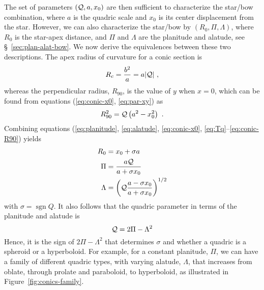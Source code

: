 \documentclass[useAMS, usenatbib, a4paper]{mnras}
\DeclareMathOperator{\sgn}{sgn}
\providecommand{\abs}[1]{\lvert#1\rvert}
\providecommand{\DIFaddbegin}{} %
\providecommand{\DIFaddend}{} %
\providecommand{\DIFdelbegin}{} %
\providecommand{\DIFdelend}{} %
\begin{document}
The set of parameters \((\mathcal{Q}, a, x_0)\) are then sufficient to
characterize the star/bow combination, where \(a\) is the quadric
scale and \(x_0\) is its center displacement from the star.  However,
we can also characterize the star/bow by \((R_0, \Pi, \Lambda)\), where
\(R_0\) is the star-apex distance, and \(\Pi\) and \(\Lambda\) are the
planitude and alatude, see \S~\ref{sec:plan-alat-bow}.  We now derive
the equivalences between these two descriptions.  The apex radius of
curvature for a conic section is
\begin{equation}
  \label{eq:Rc-conic}
  R_c = \frac{b^2}{a} = a \abs{\Q}\ ,
\end{equation}
whereas the perpendicular radius, \(R_{90}\), is the value of \(y\)
when \(x = 0\), which can be found from equations (\ref{eq:conic-x0},
\ref{eq:par-xy}) as
\DIFdelbegin %
\DIFdelend \DIFaddbegin \begin{equation}
  \label{eq:conic-R90}
  R_{90}^2 = \mathcal{Q} \left(a^2 - x_0^2\right) \ .
\end{equation}
\DIFaddend Combining equations (\ref{eq:planitude}, \ref{eq:alatude},
\ref{eq:conic-x0}, \ref{eq:Tq}--\ref{eq:conic-R90}) yields
\begin{align}
  \label{eq:R0-from-Q-a-x0}
  R_0 &= x_0 + \sigma a  \\
  \label{eq:Pi-from-Q-a-x0}
  \Pi &= \frac{a \mathcal{Q}}{a + \sigma x_0} \\
  \label{eq:Lambda-from-Q-a-x0}
  \Lambda &= \left( \mathcal{Q} \frac{a - \sigma x_0} {a + \sigma x_0}  \right)^{1/2}
\end{align}
with \(\sigma = \sgn Q\).  It also follows that the quadric parameter in
terms of the planitude and alatude is
\begin{equation}
  \label{eq:Tq-from-Pi-Lambda}
  \mathcal{Q} = 2 \Pi - \Lambda^2 
\end{equation}
Hence, it is the sign of \(2 \Pi - \Lambda^2\) that determines
\(\sigma\) and whether a quadric is a spheroid or a hyperboloid.  For
example, for a constant planitude, \(\Pi\), we can have a family of
different quadric types, with varying alatude, \(\Lambda\), that increases
from oblate, through prolate and paraboloid, to hyperboloid, as
illustrated in Figure~\ref{fig:conics-family}.
\end{document}
